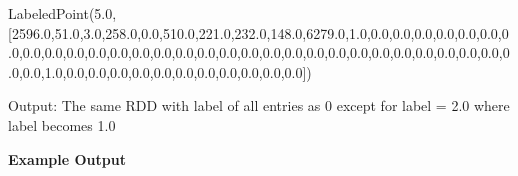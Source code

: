 \documentclass[11pt]{article}
\newenvironment{Shaded}{}{}
\newcommand{\FloatTok}[1]{\textcolor[rgb]{0.25,0.63,0.44}{{#1}}}
\newcommand{\NormalTok}[1]{{#1}}
\begin{document}
\begin{Shaded}
\begin{Highlighting}[]
\NormalTok{LabeledPoint(}\FloatTok{5.0}\NormalTok{, [}\FloatTok{2596.0}\NormalTok{,}\FloatTok{51.0}\NormalTok{,}\FloatTok{3.0}\NormalTok{,}\FloatTok{258.0}\NormalTok{,}\FloatTok{0.0}\NormalTok{,}\FloatTok{510.0}\NormalTok{,}\FloatTok{221.0}\NormalTok{,}\FloatTok{232.0}\NormalTok{,}\FloatTok{148.0}\NormalTok{,}\FloatTok{6279.0}\NormalTok{,}\FloatTok{1.0}\NormalTok{,}\FloatTok{0.0}\NormalTok{,}\FloatTok{0.0}\NormalTok{,}\FloatTok{0.0}\NormalTok{,}\FloatTok{0.0}\NormalTok{,}\FloatTok{0.0}\NormalTok{,}\FloatTok{0.0}\NormalTok{,}\FloatTok{0.0}\NormalTok{,}\FloatTok{0.0}\NormalTok{,}\FloatTok{0.0}\NormalTok{,}\FloatTok{0.0}\NormalTok{,}\FloatTok{0.0}\NormalTok{,}\FloatTok{0.0}\NormalTok{,}\FloatTok{0.0}\NormalTok{,}\FloatTok{0.0}\NormalTok{,}\FloatTok{0.0}\NormalTok{,}\FloatTok{0.0}\NormalTok{,}\FloatTok{0.0}\NormalTok{,}\FloatTok{0.0}\NormalTok{,}\FloatTok{0.0}\NormalTok{,}\FloatTok{0.0}\NormalTok{,}\FloatTok{0.0}\NormalTok{,}\FloatTok{0.0}\NormalTok{,}\FloatTok{0.0}\NormalTok{,}\FloatTok{0.0}\NormalTok{,}\FloatTok{0.0}\NormalTok{,}\FloatTok{0.0}\NormalTok{,}\FloatTok{0.0}\NormalTok{,}\FloatTok{0.0}\NormalTok{,}\FloatTok{0.0}\NormalTok{,}\FloatTok{0.0}\NormalTok{,}\FloatTok{0.0}\NormalTok{,}\FloatTok{1.0}\NormalTok{,}\FloatTok{0.0}\NormalTok{,}\FloatTok{0.0}\NormalTok{,}\FloatTok{0.0}\NormalTok{,}\FloatTok{0.0}\NormalTok{,}\FloatTok{0.0}\NormalTok{,}\FloatTok{0.0}\NormalTok{,}\FloatTok{0.0}\NormalTok{,}\FloatTok{0.0}\NormalTok{,}\FloatTok{0.0}\NormalTok{,}\FloatTok{0.0}\NormalTok{,}\FloatTok{0.0}\NormalTok{])}
\end{Highlighting}
\end{Shaded}

Output: The same RDD with label of all entries as 0 except for label =
2.0 where label becomes 1.0

\textbf{Example Output}
\end{document}
